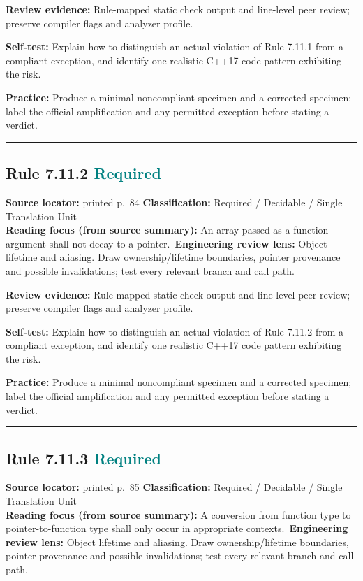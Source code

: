 \documentclass[10pt,letterpaper]{article}
\begin{document}
\textbf{Review evidence:} Rule-mapped static check output and line-level peer review; preserve compiler flags and analyzer profile.

\textbf{Self-test:} Explain how to distinguish an actual violation of Rule 7.11.1 from a compliant exception, and identify one realistic C++17 code pattern exhibiting the risk.\par
\textbf{Practice:} Produce a minimal noncompliant specimen and a corrected specimen; label the official amplification and any permitted exception before stating a verdict.
\smallskip\hrule\smallskip
\subsection*{Rule 7.11.2 \enspace \texorpdfstring{\small\textcolor{teal}{Required}}{Required}}
\noindent\textbf{Source locator:} printed p.~84 \quad\textbf{Classification:} Required / Decidable / Single Translation Unit\\
\textbf{Reading focus (from source summary):} An array passed as a function argument shall not decay to a pointer.\
\textbf{Engineering review lens:} Object lifetime and aliasing. Draw ownership/lifetime boundaries, pointer provenance and possible invalidations; test every relevant branch and call path.

\textbf{Review evidence:} Rule-mapped static check output and line-level peer review; preserve compiler flags and analyzer profile.

\textbf{Self-test:} Explain how to distinguish an actual violation of Rule 7.11.2 from a compliant exception, and identify one realistic C++17 code pattern exhibiting the risk.\par
\textbf{Practice:} Produce a minimal noncompliant specimen and a corrected specimen; label the official amplification and any permitted exception before stating a verdict.
\smallskip\hrule\smallskip
\subsection*{Rule 7.11.3 \enspace \texorpdfstring{\small\textcolor{teal}{Required}}{Required}}
\noindent\textbf{Source locator:} printed p.~85 \quad\textbf{Classification:} Required / Decidable / Single Translation Unit\\
\textbf{Reading focus (from source summary):} A conversion from function type to pointer-to-function type shall only occur in appropriate contexts.\
\textbf{Engineering review lens:} Object lifetime and aliasing. Draw ownership/lifetime boundaries, pointer provenance and possible invalidations; test every relevant branch and call path.
\end{document}
